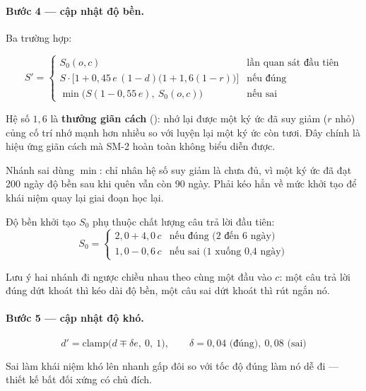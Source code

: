 \paragraph{Bước 4 — cập nhật độ bền.} Ba trường hợp:

\begin{equation}
S' =
\begin{cases}
S_0(o, c) & \text{lần quan sát đầu tiên}\\[4pt]
S \cdot \Big[1 + 0{,}45\,e\,(1-d)\big(1 + 1{,}6(1-r)\big)\Big] & \text{nếu đúng}\\[4pt]
\min\Big(S(1 - 0{,}55\,e),\ S_0(o,c)\Big) & \text{nếu sai}
\end{cases}
\end{equation}

Hệ số \(1{,}6\) là \textbf{thưởng giãn cách} (): nhớ lại được một ký ức
đã suy giảm (\(r\) nhỏ) củng cố trí nhớ mạnh hơn nhiều so với luyện lại một ký ức còn tươi.
Đây chính là hiệu ứng giãn cách mà SM-2 hoàn toàn không biểu diễn được.

Nhánh sai dùng \(\min\): chỉ nhân hệ số suy giảm là chưa đủ, vì một ký ức đã đạt 200 ngày
độ bền sau khi quên vẫn còn 90 ngày. Phải kéo hẳn về mức khởi tạo để khái niệm quay lại
giai đoạn học lại.

Độ bền khởi tạo \(S_0\) phụ thuộc chất lượng câu trả lời đầu tiên:
\begin{equation}
S_0 =
\begin{cases}
2{,}0 + 4{,}0\,c & \text{nếu đúng (2 đến 6 ngày)}\\
1{,}0 - 0{,}6\,c & \text{nếu sai (1 xuống 0,4 ngày)}
\end{cases}
\end{equation}

Lưu ý hai nhánh đi ngược chiều nhau theo cùng một đầu vào \(c\): một câu trả lời đúng dứt
khoát thì kéo dài độ bền, một câu sai dứt khoát thì rút ngắn nó.

\paragraph{Bước 5 — cập nhật độ khó.}
\begin{equation}
d' = \mathrm{clamp}\big(d \mp \delta e,\ 0,\ 1\big),
\qquad \delta = 0{,}04 \text{ (đúng)},\ 0{,}08 \text{ (sai)}
\end{equation}

Sai làm khái niệm khó lên nhanh gấp đôi so với tốc độ đúng làm nó dễ đi — thiết kế bất đối
xứng có chủ đích.

